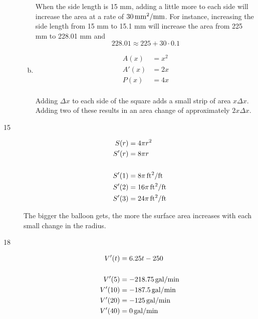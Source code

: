 \documentclass[letterpaper, landscape]{exam}
\begin{document}
\begin{description}
\begin{enumerate}[(a)]
          When the side length is 15 mm, adding a little more to each side will increase the area at
          a rate of $\unit[30]{mm^2/mm}$. For instance, increasing the side length from 15 mm to
          15.1 mm will increase the area from 225 mm to 228.01 mm and 
          \[
            228.01 \approx 225 + 30 \cdot 0.1 
          \]
          
        \item
          \begin{align*}
            A(x)  & = x^2 \\
            A'(x) & = 2x \\
            P(x)  & = 4x \\
          \end{align*}

          Adding $\Delta x$ to each side of the square adds a small strip of area $x \Delta x$.
          Adding two of these results in an area change of approximately $2 x \Delta x$. 

      \end{enumerate}

    \newpage

    \item[15]
      \begin{align*}
        S(r)  & = 4 \pi r^2 \\
        S'(r) & = 8 \pi r \\
        \\
        S'(1) &= \unit[8 \pi]{ft^2/ft} \\
        S'(2) &= \unit[16 \pi]{ft^2/ft} \\
        S'(3) &= \unit[24 \pi]{ft^2/ft} \\
      \end{align*}

      The bigger the balloon gets, the more the surface area increases with each
      small change in the radius.

    \item[18]
      \begin{align*}
        V'(t)  & = 6.25t - 250 \\
        \\
        V'(5)  & = \unit[-218.75]{gal/min} \\
        V'(10) & = \unit[-187.5]{gal/min} \\
        V'(20) & = \unit[-125]{gal/min} \\
        V'(40) & = \unit[0]{gal/min} \\
      \end{align*}


\end{description}
\end{document}

